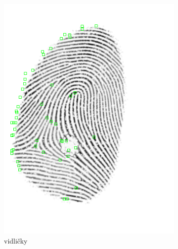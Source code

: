   \begin{figure}[h]
    \centering
    \begin{subfigure}[b]{0.3\linewidth}
      \includegraphics[width=\linewidth]{obrazky-figures/bifurcations.png}
      \caption{vidličky}
    \end{subfigure}
    \hspace{0.05\linewidth}
    \begin{subfigure}[b]{0.3\linewidth}

\end{subfigure}
\end{figure}
